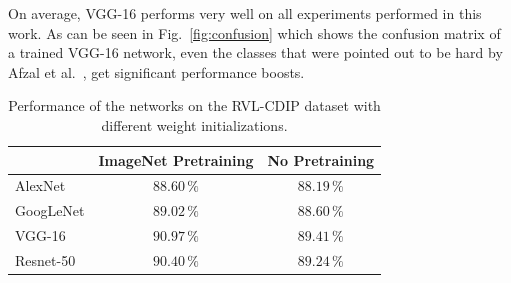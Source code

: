 On average, VGG-16 performs very well on all experiments performed in this work. As can be seen in Fig.~\ref{fig:confusion} which shows the confusion matrix of a trained VGG-16 network, even the classes that were pointed out to be hard by Afzal et al.~\cite{afzal2015deepdocclassifier}, get significant performance boosts.


\begin{table}
\renewcommand{\arraystretch}{1.3}
\centering
\caption{Performance of the networks on the RVL-CDIP dataset with different weight initializations.}
\begin{tabular}{l|c|c}
 & ImageNet Pretraining & No Pretraining \\\hline
AlexNet & $88.60\,\%$ & $88.19\,\%$ \\\hline
GoogLeNet & $89.02\,\%$ & $88.60\,\%$ \\\hline
VGG-16 & $90.97\,\%$ & $89.41\,\%$ \\\hline
Resnet-50 & $90.40\,\%$ & $89.24\,\%$
\end{tabular}
\label{tab:accuracy_large}
\end{table}


